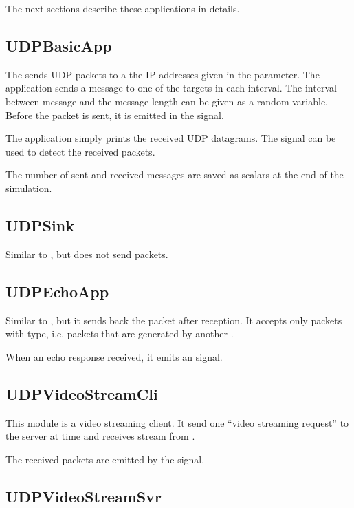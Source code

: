 The next sections describe these applications in details.

\subsection{UDPBasicApp}

The  sends UDP packets to a the IP addresses given in the
 parameter. The application sends a message to one of the
targets in each  interval. The interval between message and
the message length can be given as a random variable. Before the packet is
sent, it is emitted in the  signal.

The application simply prints the received UDP datagrams. The 
signal can be used to detect the received packets.

The number of sent and received messages are saved as scalars at the end of the
simulation.

\subsection{UDPSink}

Similar to , but does not send packets.

\subsection{UDPEchoApp}

Similar to , but it sends back the packet after reception.
It accepts only packets with  type, i.e. packets that
are generated by another .

When an echo response received, it emits an  signal.

\subsection{UDPVideoStreamCli}

This module is a video streaming client. It send one ``video streaming request'' to
the server at time  and receives stream from .

The received packets are emitted by the  signal.

\subsection{UDPVideoStreamSvr}

